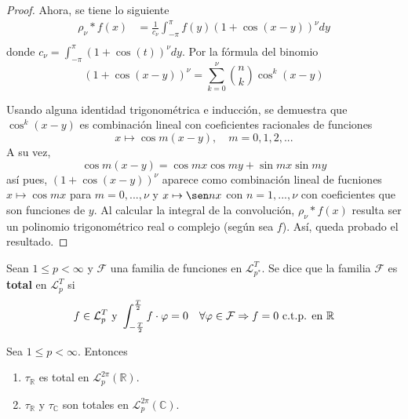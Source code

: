 \documentclass[12pt]{report}
\theoremstyle{largebreak}
\begin{document}
\begin{proof}
        Ahora, se tiene lo siguiente
        \begin{equation*}
            \begin{split}
                \rho_\nu*f(x)&=\frac{1}{c_\nu}\int_{-\pi}^\pi f(y)\left(1+\cos(x-y)\right)^\nu dy\\
            \end{split}
        \end{equation*}
        donde $c_\nu=\int_{-\pi}^\pi(1+\cos(t))^\nu dy$. Por la fórmula del binomio
        \begin{equation*}
            \left(1+\cos(x-y)\right)^\nu=\sum_{k=0}^\nu\binom{n}{k}\cos^k(x-y)
        \end{equation*}

        Usando alguna identidad trigonométrica e inducción, se demuestra que $\cos^k(x-y)$ es combinación lineal con coeficientes racionales de funciones
        \begin{equation*}
            x\mapsto \cos m(x-y),\quad m=0,1,2,...
        \end{equation*}
        A su vez,
        \begin{equation*}
            \cos m(x-y)=\cos mx\cos my+\sin mx\sin my
        \end{equation*}
        así pues, $(1+\cos (x-y))^\nu$ aparece como combinación lineal de fucniones $x\mapsto\cos mx$ para $m=0,...,\nu$ y $x\mapsto\sen nx$ con $n=1,...,\nu$ con coeficientes que son funciones de $y$. Al calcular la integral de la convolución, $\rho_\nu*f(x)$ resulta ser un polinomio trigonométrico real o complejo (según sea $f$). Así, queda probado el resultado.
    \end{proof}

    \begin{mydef}
        Sean $1\leq p<\infty$ y $\mathcal{F}$ una familia de funciones en $\mathcal{L}_{ p^*}^T$. Se dice que la familia $\mathcal{F}$ es \textbf{total} en $\mathcal{L}_{p}^T$ si
        \begin{equation*}
            f\in\mathcal{L}_p^T \textup{ y }\int_{-\frac{T}{2}}^{\frac{T}{2}}f\cdot\varphi=0\quad\forall\varphi\in\mathcal{F} \Rightarrow f=0\textup{ c.t.p. en }\mathbb{R}
        \end{equation*}
    \end{mydef}

    \begin{theor}
        Sea $1\leq p<\infty$. Entonces
        \begin{enumerate}
            \item $\tau_{\mathbb{R}}$ es total en $\mathcal{L}_p^{2\pi}(\mathbb{R})$.
            \item $\tau_{\mathbb{R}}$ y $\tau_\mathbb{C}$ son totales en $\mathcal{L}_p^{2\pi}(\mathbb{C})$.
        \end{enumerate}
    \end{theor}
\end{document}
